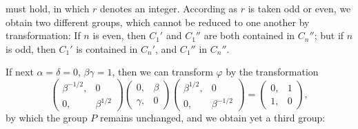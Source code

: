 
must hold, in which $r$ denotes an integer. According as $r$ is taken odd or even, we obtain two different groups, which cannot be reduced to one another by transformation:
If $n$ is even, then $C_1'$ and $C_1''$ are both contained in $C_n''$; but if $n$ is odd, then $C_1'$ is contained in $C_n'$, and $C_1''$ in $C_n''$.

If next $\alpha = \delta = 0$, $\beta\gamma = 1$, then we can transform $\varphi$ by the transformation
\[
\begin{pmatrix} \beta^{-1/2}, & 0 \\ 0, & \beta^{1/2} \end{pmatrix}
\begin{pmatrix} 0, & \beta \\ \gamma, & 0 \end{pmatrix}
\begin{pmatrix} \beta^{1/2}, & 0 \\ 0, & \beta^{-1/2} \end{pmatrix}
= \begin{pmatrix} 0, & 1 \\ 1, & 0 \end{pmatrix},
\]
by which the group $P$ remains unchanged, and we obtain yet a third group:

